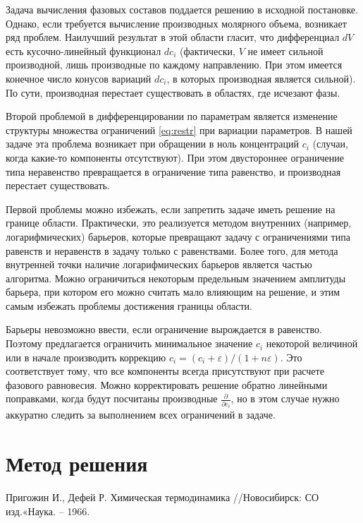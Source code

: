 \documentclass[12pt]{article}
\newcommand{\pd}[2]{\frac{\partial #1}{\partial #2}}
\renewcommand{\epsilon}{\varepsilon}
\begin{document}
Задача вычисления фазовых составов поддается решению в исходной постановке. Однако, если требуется вычисление производных молярного объема, возникает ряд проблем. Наилучший результат в этой области гласит, что дифференциал $dV$ есть кусочно-линейный функционал $dc_i$ (фактически, $V$ не имеет сильной производной, лишь производные по каждому направлению. При этом имеется конечное число конусов вариаций $dc_i$, в которых производная является сильной). По сути, производная перестает существовать в областях, где исчезают фазы.

Второй проблемой в дифференцировании по параметрам является изменение структуры множества ограничений \eqref{eq:restr} при вариации параметров. В нашей задаче эта проблема возникает при обращении в ноль концентраций $c_i$ (случаи, когда какие-то компоненты отсутствуют). При этом двустороннее ограничение типа неравенство превращается в ограничение типа равенство, и производная перестает существовать.

Первой проблемы можно избежать, если запретить задаче иметь решение на границе области. Практически, это реализуется методом внутренних (например, логарифмических) барьеров, которые превращают задачу с ограничениями типа равенств и неравенств в задачу только с равенствами. Более того, для метода внутренней точки наличие логарифмических барьеров является частью алгоритма. Можно ограничиться некоторым предельным значением амплитуды барьера, при котором его можно считать мало влияющим на решение, и этим самым избежать проблемы достижения границы области.

Барьеры невозможно ввести, если ограничение вырождается в равенство. Поэтому предлагается ограничить минимальное значение $c_i$ некоторой величиной или в начале производить коррекцию $c_i = (c_i + \epsilon)/(1 + n\epsilon)$. Это соответствует тому, что все компоненты всегда присутствуют при расчете фазового равновесия. Можно корректировать решение обратно линейными поправками, когда будут посчитаны производные $\pd{}{c_i}$, но в этом случае нужно аккуратно следить за выполнением всех ограничений в задаче.

\section{Метод решения}




\begin{thebibliography}{9}
     Пригожин И., Дефей Р. Химическая термодинамика //Новосибирск: СО изд.«Наука. – 1966.
\end{thebibliography}
\end{document}
